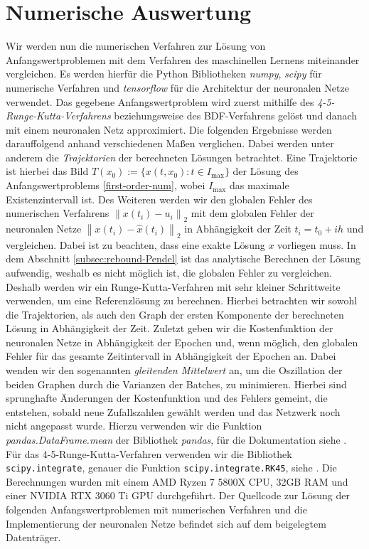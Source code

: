 \section{Numerische Auswertung}
\label{sec:verfahrensvergleich}
Wir werden nun die numerischen Verfahren zur Lösung von Anfangswertproblemen mit dem Verfahren des maschinellen Lernens
miteinander vergleichen. Es werden hierfür die Python Bibliotheken \textit{numpy}, \textit{scipy} für numerische
Verfahren und \textit{tensorflow} für die Architektur der neuronalen Netze verwendet. Das gegebene
Anfangswertproblem wird zuerst mithilfe des \textit{4-5-Runge-Kutta-Verfahrens} beziehungsweise des BDF-Verfahrens
gelöst und danach mit einem neuronalen Netz approximiert. Die folgenden Ergebnisse werden darauffolgend anhand
verschiedenen Maßen verglichen. Dabei werden unter anderem die \textit{Trajektorien} der berechneten Lösungen betrachtet.
Eine Trajektorie ist hierbei das Bild $T(x_0):= \{x(t,x_0): t\in I_{\text{max}}\}$ der Lösung des Anfangswertproblems
\eqref{first-order-num}, wobei $I_{\text{max}}$ das maximale Existenzintervall ist. Des Weiteren werden wir den globalen
Fehler des numerischen Verfahrens $\left\lVert x(t_i) - u_i \right\rVert_2$ mit dem globalen Fehler der neuronalen Netze
$\left\lVert x(t_i) - \hat{x}(t_i) \right\rVert_2$ in Abhängigkeit der Zeit $t_i=t_0 + ih$ und vergleichen. Dabei
ist zu beachten, dass eine exakte Lösung $x$ vorliegen muss. In dem Abschnitt \ref{subsec:rebound-Pendel} ist das
analytische Berechnen der Lösung aufwendig, weshalb es nicht möglich ist, die globalen Fehler zu vergleichen. Deshalb
werden wir ein Runge-Kutta-Verfahren mit sehr kleiner Schrittweite verwenden, um eine Referenzlösung zu berechnen.
Hierbei betrachten wir sowohl die Trajektorien, als auch den Graph der ersten Komponente
der berechneten Lösung in Abhängigkeit der Zeit.
Zuletzt geben wir die Kostenfunktion der neuronalen Netze in Abhängigkeit der Epochen und, wenn möglich, den globalen
Fehler für das gesamte Zeitintervall in Abhängigkeit der Epochen an. Dabei wenden wir den sogenannten
\textit{gleitenden Mittelwert} an, um die Oszillation der beiden Graphen durch die Varianzen der Batches, zu
minimieren. Hierbei sind sprunghafte Änderungen der Kostenfunktion und des Fehlers gemeint, die entstehen, sobald neue
Zufallszahlen gewählt werden und das Netzwerk noch nicht angepasst wurde. Hierzu verwenden wir die Funktion
\textit{pandas.DataFrame.mean} der Bibliothek \textit{pandas}, für die Dokumentation siehe \cite{PandasDataFrameMean}.
Für das 4-5-Runge-Kutta-Verfahren verwenden wir die Bibliothek \texttt{scipy.integrate}, genauer die Funktion
\texttt{scipy.integrate.RK45},  siehe \cite{ScipyIntegrateRK45}. Die Berechnungen wurden mit einem AMD Ryzen 7 5800X CPU,
32GB RAM und einer NVIDIA RTX 3060 Ti GPU durchgeführt. Der Quellcode zur Lösung der folgenden Anfangswertproblemen mit
numerischen Verfahren und die Implementierung der neuronalen Netze befindet sich auf dem beigelegtem Datenträger.

